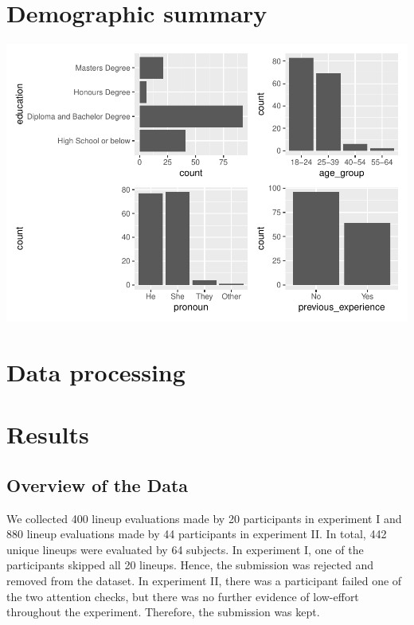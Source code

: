 \documentclass[]{interact}
\theoremstyle{plain}%
\theoremstyle{definition}
\theoremstyle{remark}
\begin{document}
\hypertarget{demographic-summary}{%
\section{Demographic summary}\label{demographic-summary}}

\includegraphics{paper_comparison_files/figure-latex/unnamed-chunk-2-1.pdf}

\hypertarget{data-processing}{%
\section{Data processing}\label{data-processing}}

\hypertarget{results}{%
\section{Results}\label{results}}

\hypertarget{overview-of-the-data}{%
\subsection{Overview of the Data}\label{overview-of-the-data}}

We collected 400 lineup evaluations made by 20 participants in
experiment I and 880 lineup evaluations made by 44 participants in
experiment II. In total, 442 unique lineups were evaluated by 64
subjects. In experiment I, one of the participants skipped all 20
lineups. Hence, the submission was rejected and removed from the
dataset. In experiment II, there was a participant failed one of the two
attention checks, but there was no further evidence of low-effort
throughout the experiment. Therefore, the submission was kept.
\end{document}

